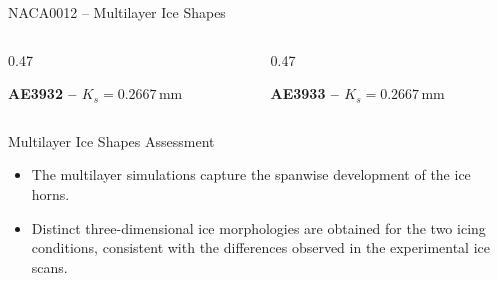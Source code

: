 
\begin{frame}{\small NACA0012 -- Multilayer Ice Shapes}
\scriptsize

\vspace{-0.15cm}

\begin{columns}[T,onlytextwidth]

\begin{column}{0.47\textwidth}
    \centering

    \textbf{AE3932 -- $K_s=0.2667\,\mathrm{mm}$}

    \vspace{0.10cm}


\end{column}

\hfill

\begin{column}{0.47\textwidth}
    \centering

    \textbf{AE3933 -- $K_s=0.2667\,\mathrm{mm}$}

    \vspace{0.10cm}


\end{column}

\end{columns}

\vspace{0.15cm}

\begin{block}{\scriptsize Multilayer Ice Shapes Assessment}
\begin{itemize}
    \item The multilayer simulations capture the spanwise development of the ice horns.
    \item Distinct three-dimensional ice morphologies are obtained for the two icing conditions, consistent with the differences observed in the experimental ice scans.
\end{itemize}
\end{block}

\end{frame}

